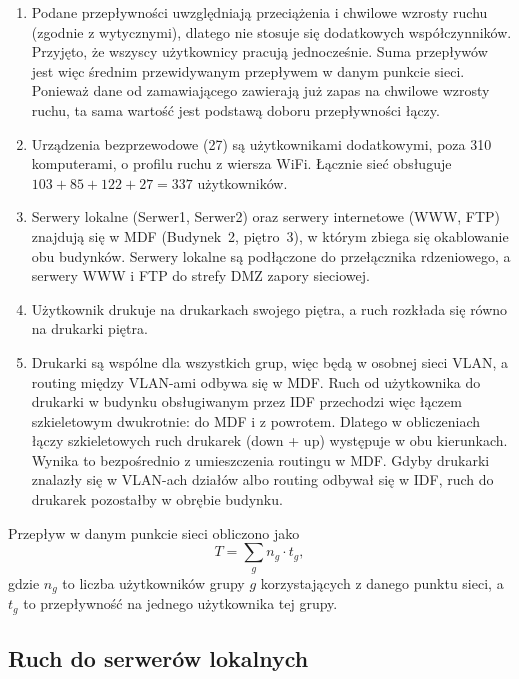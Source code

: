 \documentclass[12pt,a4paper]{article}
\begin{document}
\begin{enumerate}
  \item Podane przepływności uwzględniają przeciążenia i chwilowe wzrosty
  ruchu (zgodnie z wytycznymi), dlatego nie stosuje się dodatkowych
  współczynników. Przyjęto, że wszyscy użytkownicy pracują jednocześnie.
  Suma przepływów jest więc średnim przewidywanym przepływem w danym punkcie
  sieci. Ponieważ dane od zamawiającego zawierają już zapas na chwilowe wzrosty
  ruchu, ta sama wartość jest podstawą doboru przepływności łączy.
  \item Urządzenia bezprzewodowe (27) są użytkownikami dodatkowymi, poza
  310 komputerami, o profilu ruchu z wiersza WiFi. Łącznie sieć obsługuje
  $103 + 85 + 122 + 27 = 337$ użytkowników.
  \item Serwery lokalne (Serwer1, Serwer2) oraz serwery internetowe (WWW, FTP)
  znajdują się w MDF (Budynek~2, piętro~3), w którym zbiega się okablowanie
  obu budynków. Serwery lokalne są podłączone do przełącznika rdzeniowego,
  a serwery WWW i FTP do strefy DMZ zapory sieciowej.
  \item Użytkownik drukuje na drukarkach swojego piętra, a ruch rozkłada się
  równo na drukarki piętra.
  \item Drukarki są wspólne dla wszystkich grup, więc będą w osobnej sieci
  VLAN, a routing między VLAN-ami odbywa się w MDF. Ruch od użytkownika do
  drukarki w budynku obsługiwanym przez IDF przechodzi więc łączem
  szkieletowym dwukrotnie: do MDF i z powrotem. Dlatego w obliczeniach łączy
  szkieletowych ruch drukarek (down + up) występuje w obu kierunkach. Wynika to
  bezpośrednio z umieszczenia routingu w MDF. Gdyby drukarki znalazły się
  w VLAN-ach działów albo routing odbywał się w IDF, ruch do drukarek
  pozostałby w obrębie budynku.
\end{enumerate}

Przepływ w danym punkcie sieci obliczono jako
\begin{equation}
  T = \sum_{g} n_g \cdot t_g ,
  \label{eq:suma}
\end{equation}
gdzie $n_g$ to liczba użytkowników grupy $g$ korzystających z danego punktu
sieci, a $t_g$ to przepływność na jednego użytkownika tej grupy.

\subsection{Ruch do serwerów lokalnych}
\end{document}
